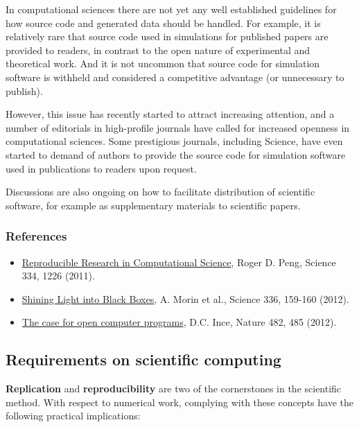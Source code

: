 \documentclass[11pt]{article}
\begin{document}
In computational sciences there are not yet any well established
guidelines for how source code and generated data should be handled. For
example, it is relatively rare that source code used in simulations for
published papers are provided to readers, in contrast to the open nature
of experimental and theoretical work. And it is not uncommon that source
code for simulation software is withheld and considered a competitive
advantage (or unnecessary to publish).

However, this issue has recently started to attract increasing
attention, and a number of editorials in high-profile journals have
called for increased openness in computational sciences. Some
prestigious journals, including Science, have even started to demand of
authors to provide the source code for simulation software used in
publications to readers upon request.

Discussions are also ongoing on how to facilitate distribution of
scientific software, for example as supplementary materials to
scientific papers.

    \hypertarget{references}{%
\subsubsection{References}\label{references}}

    \begin{itemize}
\item
  \href{http://dx.doi.org/10.1126/science.1213847}{Reproducible Research
  in Computational Science}, Roger D. Peng, Science 334, 1226 (2011).
\item
  \href{http://dx.doi.org/10.1126/science.1218263}{Shining Light into
  Black Boxes}, A. Morin et al., Science 336, 159-160 (2012).
\item
  \href{http://dx.doi.org/doi:10.1038/nature10836}{The case for open
  computer programs}, D.C. Ince, Nature 482, 485 (2012).
\end{itemize}

    \hypertarget{requirements-on-scientific-computing}{%
\subsection{Requirements on scientific
computing}\label{requirements-on-scientific-computing}}

    \textbf{Replication} and \textbf{reproducibility} are two of the
cornerstones in the scientific method. With respect to numerical work,
complying with these concepts have the following practical implications:
\end{document}
